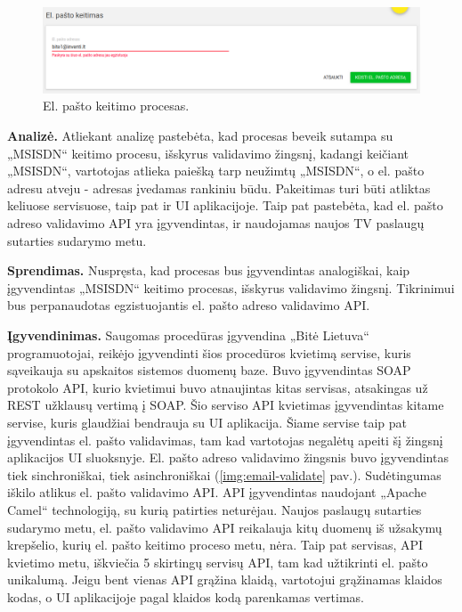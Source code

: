 \begin{figure}[H]
    \centering
    \includegraphics[scale=0.3]{img/email-change.png}
    \caption{El. pašto keitimo procesas.}
    \label{img:email-change}
\end{figure}

\textbf{Analizė.} Atliekant analizę pastebėta, kad procesas beveik sutampa su „MSISDN“ keitimo procesu, išskyrus validavimo žingsnį, kadangi keičiant „MSISDN“,
vartotojas atlieka paiešką tarp neužimtų „MSISDN“, o el. pašto adresu atveju - adresas įvedamas rankiniu būdu. Pakeitimas turi būti atliktas keliuose servisuose,
taip pat ir UI aplikacijoje. Taip pat pastebėta, kad el. pašto adreso validavimo API yra įgyvendintas, ir naudojamas naujos TV paslaugų sutarties sudarymo metu.

\textbf{Sprendimas.}
Nuspręsta, kad procesas bus įgyvendintas analogiškai, kaip įgyvendintas „MSISDN“ keitimo procesas, išskyrus validavimo žingsnį. Tikrinimui bus perpanaudotas
egzistuojantis el. pašto adreso validavimo API.

\textbf{Įgyvendinimas.}
Saugomas procedūras įgyvendina „Bitė Lietuva“ programuotojai, reikėjo įgyvendinti šios procedūros kvietimą servise, kuris sąveikauja su apskaitos sistemos duomenų baze.
Buvo įgyvendintas SOAP protokolo API, kurio kvietimui buvo atnaujintas kitas servisas, atsakingas už REST užklausų vertimą į SOAP. Šio serviso API kvietimas įgyvendintas
kitame servise, kuris glaudžiai bendrauja su UI aplikacija. Šiame servise taip pat įgyvendintas el. pašto validavimas, tam kad vartotojas negalėtų apeiti šį žingsnį aplikacijos UI
sluoksnyje. El. pašto adreso validavimo žingsnis buvo įgyvendintas tiek sinchroniškai, tiek asinchroniškai (\ref{img:email-validate} pav.).
Sudėtingumas iškilo atlikus el. pašto validavimo API. API įgyvendintas naudojant „Apache Camel“ technologiją, su kurią patirties neturėjau.
Naujos paslaugų sutarties sudarymo metu, el. pašto validavimo API reikalauja kitų duomenų iš užsakymų krepšelio, kurių el. pašto keitimo proceso metu, nėra.
Taip pat servisas, API kvietimo metu, iškviečia 5 skirtingų servisų API, tam kad užtikrinti el. pašto unikalumą. Jeigu bent vienas API grąžina klaidą, vartotojui grąžinamas
klaidos kodas, o UI aplikacijoje pagal klaidos kodą parenkamas vertimas.


